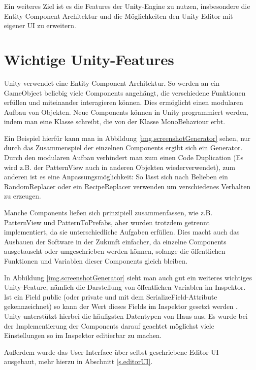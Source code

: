 Ein weiteres Ziel ist es die Features der Unity-Engine zu nutzen, insbesondere die Entity-Component-Architektur und die Möglichkeiten den Unity-Editor mit eigener UI zu erweitern. 

\section{Wichtige Unity-Features}

Unity verwendet eine Entity-Component-Architektur. So werden an ein GameObject beliebig viele Components angehängt, die verschiedene Funktionen erfüllen und miteinander interagieren können. Dies ermöglicht einen modularen Aufbau von Objekten. 
\cite[Seite: GameObjects]{unityManual}
Neue Components können in Unity programmiert werden, indem man eine Klasse schreibt, die von der Klasse MonoBehaviour erbt.
\cite[Seite: CreatingAndUsingScripts]{unityManual}

Ein Beispiel hierfür kann man in Abbildung \ref{img.screenshotGenerator} sehen, nur durch das Zusammenspiel der einzelnen Components ergibt sich ein Generator. Durch den modularen Aufbau verhindert man zum einen Code Duplication (Es wird z.B. der PatternView auch in anderen Objekten wiederverwendet), zum anderen ist es eine Anpassungsmöglichkeit: So lässt sich nach Belieben ein RandomReplacer oder ein RecipeReplacer verwenden um verschiedenes Verhalten zu erzeugen. 

Manche Components ließen sich prinzipiell zusammenfassen, wie z.B. PatternView und PatternToPrefabs, aber wurden trotzdem getrennt implementiert, da sie unterschiedliche Aufgaben erfüllen. Dies macht auch das Ausbauen der Software in der Zukunft einfacher, da einzelne Components ausgetauscht oder umgeschrieben werden können, solange die öffentlichen Funktionen und Variablen dieser Components gleich bleiben.

In Abbildung \ref{img.screenshotGenerator} sieht man auch gut ein weiteres wichtiges Unity-Feature, nämlich die Darstellung von öffentlichen Variablen im Inspektor. Ist ein Field public (oder private und mit dem SerializeField-Attribute gekennzeichnet) so kann der Wert dieses Fields im Inspektor gesetzt werden \cite[Seite: VariablesAndTheInspector]{unityManual} \cite[Seite: SerializeField]{unitySciptingReference}. Unity unterstützt hierbei die häufigsten Datentypen von Haus aus. Es wurde bei der Implementierung der Components darauf geachtet möglichst viele Einstellungen so im Inspektor editierbar zu machen.

Außerdem wurde das User Interface über selbst geschriebene Editor-UI ausgebaut, mehr hierzu in Abschnitt \ref{s.editorUI}.

